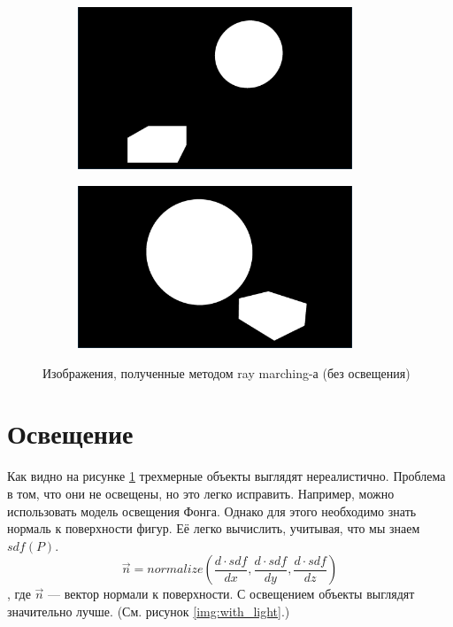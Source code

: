 \documentclass[12pt,a4paper]{article}
\begin{document}
\begin{figure}[H]
    \centering
    \begin{subfigure}{0.5\textwidth}
        \includegraphics[width=0.9\textwidth]{no_light_screenshot}
    \end{subfigure}%
    \begin{subfigure}{0.5\textwidth}
        \includegraphics[width=0.9\textwidth]{no_light_screenshot2}
    \end{subfigure}
    \caption{Изображения, полученные методом ray marching-а (без освещения)}
    \label{img:no_light}
\end{figure}


\section{Освещение}
Как видно на рисунке \ref{img:no_light} трехмерные объекты выглядят
нереалистично. Проблема в том, что они не освещены, но это легко исправить.
Например, можно использовать модель освещения Фонга. Однако для этого необходимо
знать нормаль к поверхности фигур. Её легко вычислить, учитывая, что мы знаем
$sdf(P)$. $$\vec{n} = normalize\left(\frac{d \cdot sdf}{dx}, \frac{d \cdot sdf}{dy},
\frac{d \cdot sdf}{dz}\right)$$, где $\vec{n}$ --- вектор нормали к поверхности.
С освещением объекты выглядят значительно лучше. (См. рисунок \ref{img:with_light}.)
\end{document}
